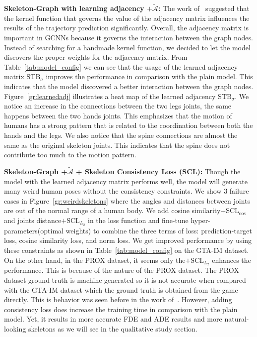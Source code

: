 \documentclass[10pt,twocolumn,letterpaper]{article}
\newcommand*{\ours}{Skeleton-Graph }
\begin{document}
\textbf{\ours with learning adjacency $+\tilde{\mathcal{A}}$: }
The work of~\cite{mohamed2020social} suggested that the kernel function that governs the value of the adjacency matrix influences the results of the trajectory prediction significantly. Overall, the adjacency matrix is important in GCNNs because it governs the interaction between the graph nodes. Instead of searching for a handmade kernel function, we decided to let the model discovers the proper weights for the adjacency matrix. From Table~\ref{tab:model_config} we can see that the usage of the learned adjacency matrix $\text{STB}_{\sigma}$ improves the performance in comparison with the plain model. This indicates that the model discovered a better interaction between the graph nodes. Figure~\ref{gr:learnedadj} illustrates a heat map of the learned adjacency $\text{STB}_{\sigma}$. We notice an increase in the connections between the two legs joints, the same happens between the two hands joints. This emphasizes that the motion of humans has a strong pattern that is related to the coordination between both the hands and the legs. We also notice that the spine connections are almost the same as the original skeleton joints. This indicates that the spine does not contribute too much to the motion pattern.

\textbf{\ours +$\tilde{\mathcal{A}}$ + Skeleton Consistency Loss (SCL):}
Though the model with the learned adjacency matrix performs well, the model will generate many weird human poses without the consistency constraints. We show 3 failure cases in Figure~\ref{gr:weirdskeletons} where the angles and distances between joints are out of the normal range of a human body. 
We add cosine similarity$+\text{SCL}_{\cos}$ and joints distance$+\text{SCL}_{L_2}$ in the loss function and fine-tune hyper-parameters(optimal weights) to combine the three terms of loss: prediction-target loss, cosine similarity loss, and norm loss. We get improved performance by using these constraints as shown in Table~\ref{tab:model_config} on the GTA-IM dataset. On the other hand, in the PROX dataset, it seems only the$+\text{SCL}_{L_2}$ enhances the performance. This is because of the nature of the PROX dataset. The PROX dataset ground truth is machine-generated so it is not accurate when compared with the GTA-IM dataset which the ground truth is obtained from the game directly. This is behavior was seen before in the work of~\cite{cao2020long}. However, adding consistency loss does increase the training time in comparison with the plain model. Yet, it results in more accurate FDE and ADE results and more natural-looking skeletons as we will see in the qualitative study section.
\end{document}
